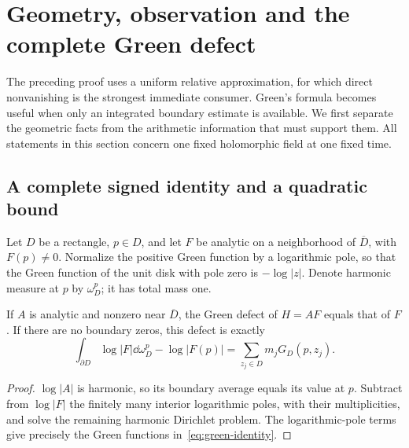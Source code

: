 \section{Geometry, observation and the complete Green defect}\label{sec:geometry}

The preceding proof uses a uniform relative approximation, for which
direct nonvanishing is the strongest immediate consumer. Green's formula
becomes useful when only an integrated boundary estimate is available.
We first separate the geometric facts from the arithmetic information
that must support them. All statements in this section concern one
fixed holomorphic field at one fixed time.

\subsection{A complete signed identity and a quadratic bound}

Let $D$ be a rectangle, $p\in D$, and let $F$ be analytic on a
neighborhood of $\overline D$, with $F(p)\ne0$. Normalize the positive
Green function by a logarithmic pole, so that the Green function of
the unit disk with pole zero is $-\log|z|$. Denote harmonic measure
at $p$ by $\omega_D^p$; it has total mass one.

\begin{lemma}\label{lem:normalization-green}
If $A$ is analytic and nonzero near $\overline D$, the Green defect
of $H=AF$ equals that of $F$. If there are no boundary zeros, this
defect is exactly
\begin{equation}\label{eq:green-identity}
 \int_{\partial D}\log|F|\dd\omega_D^p-\log|F(p)|
 =\sum_{z_j\in D}m_jG_D(p,z_j).
\end{equation}
\end{lemma}
\begin{proof}
$\log|A|$ is harmonic, so its boundary average equals its value at
$p$. Subtract from $\log|F|$ the finitely many interior logarithmic
poles, with their multiplicities, and solve the remaining harmonic
Dirichlet problem. The logarithmic-pole terms give precisely the
Green functions in~\eqref{eq:green-identity}.
\end{proof}

